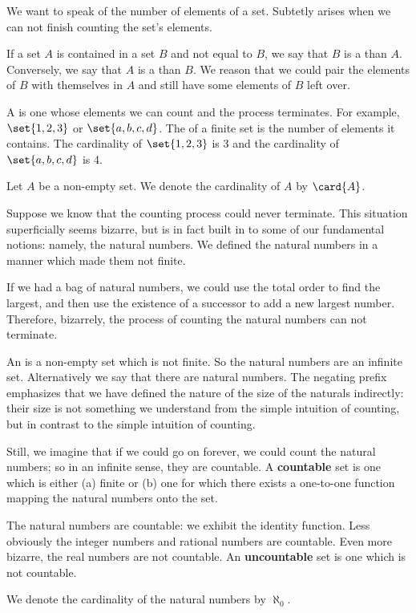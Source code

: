 

We want to speak of the number of elements
of a set. Subtetly arises when we can not finish
counting the set's elements.


If a set $A$ is contained in a set $B$ and not equal to $B$,
we say that $B$ is a  than $A$.
Conversely, we say that $A$ is a  than $B$.
We reason that we could pair the elements of $B$ with themselves
in $A$ and still have some elements of $B$ left over.

A  is one whose elements we can count
and the process terminates.
For example, $\set{1, 2, 3}$ or $\set{a,b,c,d}$.
The  of a finite set is the number of
elements it contains.
The cardinality of $\set{1, 2, 3}$ is 3 and the cardinality of
$\set{a,b,c,d}$ is 4.


Let $A$ be a non-empty set.
We denote the cardinality of $A$ by $\card{A}$.


Suppose we know that the counting process could never terminate.
This situation superficially seems bizarre, but is in fact built
in to some of our fundamental notions: namely, the natural numbers.
We defined the natural numbers in a manner which made them not
finite.

If we had a bag of natural numbers, we could use the total order
to find the largest, and then use the existence of a successor to
add a new largest number.
Therefore, bizarrely, the process of counting the natural numbers
can not terminate.

An  is a non-empty set which is not finite.
So the natural numbers are an infinite set.
Alternatively we say that there are 
natural numbers.
The negating prefix  emphasizes that we have defined
the nature of the size of the naturals indirectly: their size
is not something we understand from the simple intuition of
counting, but in contrast to the simple intuition of counting.

Still, we imagine that if we could go on forever, we could count
the natural numbers; so in an infinite sense, they are countable.
A \textbf{countable} set is one which is either (a) finite or
(b) one for which there exists a one-to-one function mapping
the natural numbers onto the set.

The natural numbers are countable: we exhibit the identity function.
Less obviously the integer numbers and rational numbers are countable.
Even more bizarre, the real numbers are not countable.
An \textbf{uncountable} set is one which is not countable.


We denote the cardinality of the natural numbers by $\aleph_0$.
